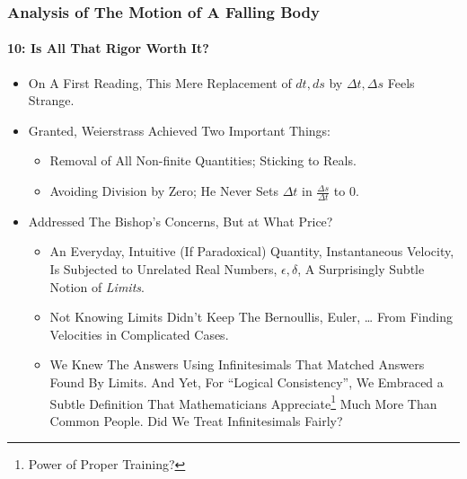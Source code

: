 \begin{frame}
\frametitle{Analysis of The Motion of \alert{A Falling Body}}
\framesubtitle{10: Is All That Rigor Worth It?}
\label{slide:analysis-of-falling-body-10}
\begin{itemize}
\pause
\item On A First Reading, This \alert{Mere Replacement of $dt, ds$ by $\Delta t, \Delta s$ Feels Strange}. 
\pause
\item Granted, Weierstrass \alert{Achieved Two Important Things}:
\begin{itemize}
\pause
\item Removal of All Non-finite Quantities; \alert{Sticking to Reals}.
\pause
\item \alert{Avoiding Division by Zero}; He Never Sets $\Delta t$ in $\frac{\Delta s}{\Delta t}$ to 0.
\end{itemize}
\pause
\item Addressed The Bishop's Concerns, But \alert{at What Price}?
\begin{itemize}
\item An Everyday, Intuitive (If Paradoxical) Quantity, Instantaneous Velocity, Is Subjected to Unrelated Real Numbers, $\epsilon,\delta$, A \alert{Surprisingly Subtle Notion of \textit{Limits}}.
\pause
\item \alert{Not Knowing Limits Didn't Keep The Bernoullis, Euler, \dots} From Finding Velocities in Complicated Cases.
\pause
\item We Knew The Answers Using Infinitesimals That Matched Answers Found By Limits. And Yet, For ``Logical Consistency'', We Embraced a Subtle Definition That Mathematicians Appreciate\footnote{\tiny Power of Proper Training?} Much More Than Common People. \alert{Did We Treat Infinitesimals Fairly}?
\end{itemize}
\end{itemize}
\end{frame}
